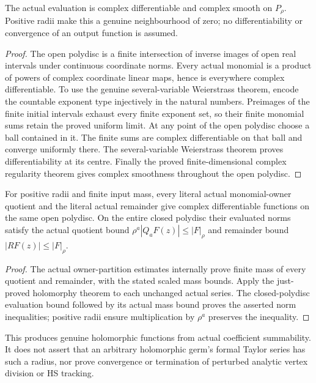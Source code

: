 \begin{theorem}
\label{hir:actual-coefficient-polydisc-holomorphy}
The actual evaluation is complex differentiable and complex smooth on
$P_\rho$. Positive radii make this a genuine neighbourhood of zero;
no differentiability or convergence of an output function is assumed.
\leanok
\end{theorem}
\begin{proof}
The open polydisc is a finite intersection of inverse images of open
real intervals under continuous coordinate norms. Every actual
monomial is a product of powers of complex coordinate linear maps,
hence is everywhere complex differentiable. To use the genuine
several-variable Weierstrass theorem, encode the countable exponent
type injectively in the natural numbers. Preimages of the finite
initial intervals exhaust every finite exponent set, so their finite
monomial sums retain the proved uniform limit. At any point of the
open polydisc choose a ball contained in it. The finite sums are
complex differentiable on that ball and converge uniformly there.
The several-variable Weierstrass theorem proves differentiability at
its centre. Finally the proved finite-dimensional complex regularity
theorem gives complex smoothness throughout the open polydisc.
\end{proof}

\begin{theorem}
\label{hir:actual-monomial-owner-holomorphic-evaluation}
For positive radii and finite input mass, every literal actual
monomial-owner quotient and the literal actual remainder give complex
differentiable functions on the same open polydisc. On the entire
closed polydisc their evaluated norms satisfy the actual quotient
bound $\rho^a|Q_aF(z)|\leq|F|_\rho$ and remainder bound
$|RF(z)|\leq|F|_\rho$.
\leanok
\end{theorem}
\begin{proof}
The actual owner-partition estimates internally prove finite mass of
every quotient and remainder, with the stated scaled mass bounds.
Apply the just-proved holomorphy theorem to each unchanged actual
series. The closed-polydisc evaluation bound followed by its actual
mass bound proves the asserted norm inequalities; positive radii
ensure multiplication by $\rho^a$ preserves the inequality.
\end{proof}

This produces genuine holomorphic functions from actual coefficient
summability. It does not assert that an arbitrary holomorphic germ's
formal Taylor series has such a radius, nor prove convergence or
termination of perturbed analytic vertex division or HS tracking.
